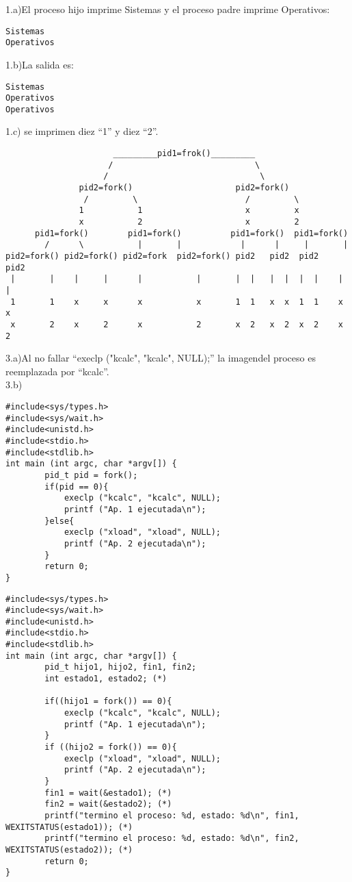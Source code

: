\documentclass{article}
\begin{document}
1.a)El proceso hijo imprime Sistemas y el proceso padre imprime Operativos:
\begin{verbatim}
Sistemas
Operativos
\end{verbatim}

1.b)La salida es:
\begin{verbatim}
Sistemas
Operativos
Operativos
\end{verbatim}

1.c) se imprimen diez ``1'' y diez ``2''.

\begin{verbatim}
                      _________pid1=frok()_________
                     /                             \
                    /                               \
               pid2=fork()                     pid2=fork()
                /         \                      /         \
               1           1                     x         x
               x           2                     x         2
      pid1=fork()        pid1=fork()          pid1=fork()  pid1=fork()
        /      \           |       |            |      |     |       |
pid2=fork() pid2=fork() pid2=fork  pid2=fork() pid2   pid2  pid2    pid2
 |       |    |     |      |           |       |  |   |  |  |  |    |  |
 1       1    x     x      x           x       1  1   x  x  1  1    x  x
 x       2    x     2      x           2       x  2   x  2  x  2    x  2
\end{verbatim}

3.a)Al no fallar ``execlp ("kcalc", "kcalc", NULL);''
la imagendel proceso es reemplazada por ``kcalc''.\\

3.b)
\begin{verbatim}
#include<sys/types.h>
#include<sys/wait.h>
#include<unistd.h>
#include<stdio.h>
#include<stdlib.h>
int main (int argc, char *argv[]) {
        pid_t pid = fork();
        if(pid == 0){
            execlp ("kcalc", "kcalc", NULL);
            printf ("Ap. 1 ejecutada\n");
        }else{
            execlp ("xload", "xload", NULL);
            printf ("Ap. 2 ejecutada\n");
        }
        return 0;
}
\end{verbatim}
\begin{verbatim}
#include<sys/types.h>
#include<sys/wait.h>
#include<unistd.h>
#include<stdio.h>
#include<stdlib.h>
int main (int argc, char *argv[]) {
        pid_t hijo1, hijo2, fin1, fin2;
        int estado1, estado2; (*)
        
        if((hijo1 = fork()) == 0){
            execlp ("kcalc", "kcalc", NULL);
            printf ("Ap. 1 ejecutada\n");
        }
        if ((hijo2 = fork()) == 0){
            execlp ("xload", "xload", NULL);
            printf ("Ap. 2 ejecutada\n");
        }
        fin1 = wait(&estado1); (*)
        fin2 = wait(&estado2); (*)
        printf("termino el proceso: %d, estado: %d\n", fin1, WEXITSTATUS(estado1)); (*)
        printf("termino el proceso: %d, estado: %d\n", fin2, WEXITSTATUS(estado2)); (*)
        return 0;
}
\end{verbatim}
\end{document}
